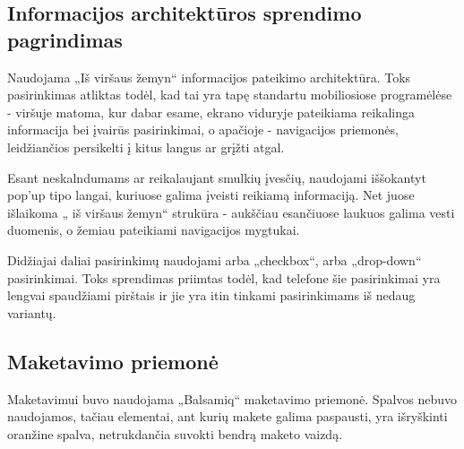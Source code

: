 \documentclass{VUMIFPSkursinis}
\begin{document}
\subsection{Informacijos architektūros sprendimo pagrindimas}
Naudojama „Iš viršaus žemyn“ informacijos pateikimo architektūra. Toks pasirinkimas atliktas todėl, kad tai yra tapę standartu mobiliosiose programėlėse - viršuje matoma, kur dabar esame, ekrano viduryje pateikiama reikalinga informacija bei įvairūs pasirinkimai, o apačioje - navigacijos priemonės, leidžiančios persikelti į kitus langus ar grįžti atgal. 

Esant neskalndumams ar reikalaujant smulkių įvesčių, naudojami iššokantyt pop'up tipo langai, kuriuose galima įveisti reikiamą informaciją. Net juose išlaikoma „ iš viršaus žemyn“ strukūra - aukščiau esančiuose laukuos galima vesti duomenis, o žemiau pateikiami navigacijos mygtukai.

Didžiajai daliai pasirinkimų naudojami arba „checkbox“, arba „drop-down“ pasirinkimai. Toks sprendimas priimtas todėl, kad telefone šie pasirinkimai yra lengvai spaudžiami pirštais ir jie yra itin tinkami pasirinkimams iš nedaug variantų. 

\subsection{Maketavimo priemonė}
Maketavimui buvo naudojama „Balsamiq“ maketavimo priemonė. Spalvos nebuvo naudojamos, tačiau elementai, ant kurių makete galima paspausti, yra išryškinti oranžine spalva, netrukdančia suvokti bendrą maketo vaizdą.
























\printbibliography[heading=bibintoc, title=Šaltiniai]  %
\end{document}
